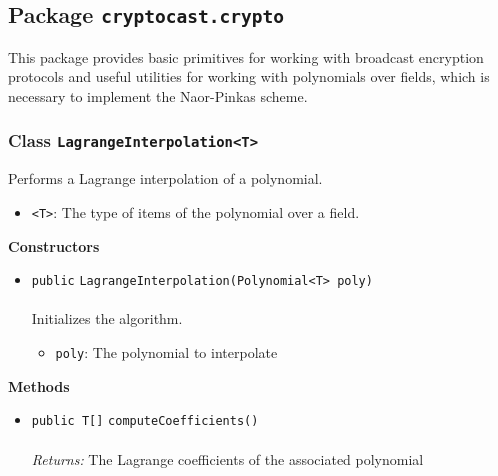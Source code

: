 \subsection{Package \lstinline!cryptocast.crypto!}
This package provides basic primitives for working with broadcast encryption protocols
 and useful utilities for working with polynomials over fields, which is necessary to implement
 the Naor-Pinkas scheme.

\subsubsection{Class \lstinline|LagrangeInterpolation<T>|}
Performs a Lagrange interpolation of a polynomial. \\
\noindent\begin{minipage}[t]{5cm}
\vspace{0.3em}
\hspace*{2em}
\vspace{0.3em}
\end{minipage}

\begin{itemize}
\item \lstinline|<T>|: The type of items of the polynomial over a field.
\end{itemize}



\textbf{\sffamily Constructors}
\begin{itemize}
\item \lstinline|public| \lstinline|LagrangeInterpolation|\lstinline|(Polynomial<T> poly)|\\ \\[-0.6em]
Initializes the algorithm.
\begin{itemize}
\item \lstinline|poly|: The polynomial to interpolate
\end{itemize}



\end{itemize}


\textbf{\sffamily Methods}
\begin{itemize}
\item \lstinline|public T[]| \lstinline|computeCoefficients|\lstinline|()|\\ \\[-0.6em]
\emph{Returns:} The Lagrange coefficients of the associated polynomial



\end{itemize}

